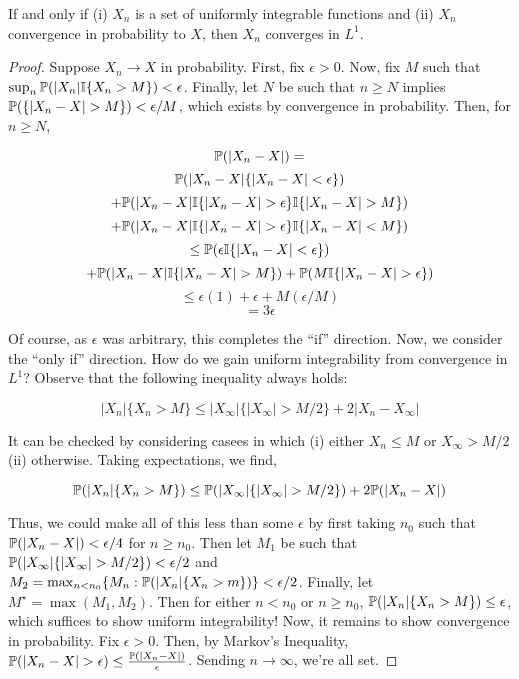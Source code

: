     \begin{theorem}
        If and only if (i) $X_n$ is a set of uniformly integrable functions 
        and (ii) $X_n$ convergence in probability to $X$, then $X_n$ converges in $L^1$.
    \end{theorem}
    \begin{proof}
        Suppose $X_n \to X$ in probability. First, fix $\epsilon > 0$. Now, 
        fix $M$ such that $\sup_n \mathbb P(|X_n|\mathbb I\{X_n > M\}) < \epsilon$. 
        Finally, let $N$ be such that $n \geq N$ implies $\mathbb P(\{|X_n - X| > M\}) < \epsilon/M$, which exists 
        by convergence in probability. Then, for $n \geq N$,
        
        \[ \mathbb P(|X_n - X|) = \] 
        \[ \mathbb P(|X_n - X|\{|X_n - X| < \epsilon\}) \]
        \[ + \mathbb P(|X_n - X| \mathbb I\{|X_n - X| > \epsilon \}\mathbb I\{|X_n - X| > M\})  \] 
        \[ + \mathbb P(|X_n - X| \mathbb I\{|X_n - X| > \epsilon \}\mathbb I\{|X_n - X| < M\}) \]
        \[ \leq \mathbb P(\epsilon \mathbb I\{|X_n - X| < \epsilon\}) \] 
        \[ + \mathbb P(|X_n - X|\mathbb I\{|X_n - X| > M\}) + \mathbb P(M\mathbb I\{|X_n - X| > \epsilon\}) \]
        \[ \leq \epsilon(1) + \epsilon + M(\epsilon/M) \] 
        \[ = 3\epsilon \]

        Of course, as $\epsilon$ was arbitrary, this completes the ``if'' direction. Now, 
        we consider the ``only if'' direction. How do we gain uniform integrability from convergence in 
        $L^1$? Observe that the following inequality always holds:

        \[ |X_n|\{X_n > M\} \leq |X_\infty|\{|X_\infty| > M/2\} + 2 |X_n - X_\infty| \]

        It can be checked by considering casees in which (i) either $X_n \leq M$ 
        or $X_\infty > M/2$ (ii) otherwise. Taking expectations, we find, 

        \[ \mathbb P(|X_n|\{X_n > M\}) \leq \mathbb P(|X_\infty|\{|X_\infty| > M/2\}) + 2\mathbb P(|X_n-X|) \]

        Thus, we could make all of this less than some $\epsilon$ by first taking 
        $n_0$ such that $\mathbb P(|X_n-X|) < \epsilon/4$ for $n \geq n_0$. Then let 
        $M_1$ be such that $\mathbb P(|X_\infty|\{|X_\infty| > M/2\}) < \epsilon/2$ and 
        $M_2 = \max_{n < n_0} \{M_n : \mathbb P(|X_n|\{X_n > m\})\} < \epsilon/2$. Finally, let 
        $M^\star = \max(M_1,M_2)$. Then for either 
        $n < n_0$ or $n \geq n_0$, $\mathbb P(|X_n|\{X_n > M\}) \leq \epsilon$, which suffices to show 
        uniform integrability! Now, it remains to show convergence in probability. Fix $\epsilon > 0$. 
        Then, by Markov's Inequality, $\mathbb P(|X_n - X| > \epsilon) \leq \frac{\mathbb P(|X_n - X|)}{\epsilon}$. 
        Sending $n \to \infty$, we're all set. 

    \end{proof}


